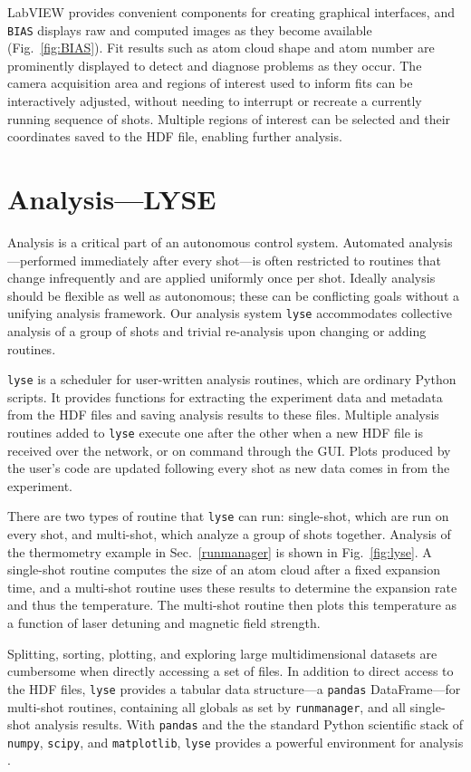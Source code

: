 LabVIEW provides convenient components for creating graphical interfaces, and \texttt{BIAS} displays raw and computed images as they become available (Fig.~\ref{fig:BIAS}).
Fit results such as atom cloud shape and atom number are prominently displayed to detect and diagnose problems as they occur.
The camera acquisition area and regions of interest used to inform fits can be interactively adjusted, without needing to interrupt or recreate a currently running sequence of shots.
Multiple regions of interest can be selected and their coordinates saved to the HDF file, enabling further analysis.



\section{Analysis---LYSE}\label{lyse}

Analysis is a critical part of an autonomous control system.
Automated analysis---performed immediately after every shot---is often restricted to routines that change infrequently and are applied uniformly once per shot.
Ideally analysis should be flexible as well as autonomous; these can be conflicting goals without a unifying analysis framework.
Our analysis system \texttt{lyse} accommodates collective analysis of a group of shots and trivial re-analysis upon changing or adding routines.

\texttt{lyse} is a scheduler for user-written analysis routines, which are ordinary Python scripts.
It provides functions for extracting the experiment data and metadata from the HDF files and saving analysis results to these files.
Multiple analysis routines added to \texttt{lyse} execute one after the other when a new HDF file is received over the network, or on command through the GUI.
Plots produced by the user's code are updated following every shot as new data comes in from the experiment.

There are two types of routine that \texttt{lyse} can run: single-shot, which are run on every shot, and multi-shot, which analyze a group of shots together.
Analysis of the thermometry example in Sec.~\ref{runmanager} is shown in Fig.~\ref{fig:lyse}.
A single-shot routine computes the size of an atom cloud after a fixed expansion time, and a multi-shot routine uses these results to determine the expansion rate and thus the temperature.
The multi-shot routine then plots this temperature as a function of laser detuning and magnetic field strength.

Splitting, sorting, plotting, and exploring large multidimensional datasets are cumbersome when directly accessing a set of files.
In addition to direct access to the HDF files, \texttt{lyse} provides a tabular data structure---a \texttt{pandas}\cite{mckinney_pandas} DataFrame---for multi-shot routines, containing all globals as set by \texttt{runmanager}, and all single-shot analysis results.
With \texttt{pandas} and the the standard Python scientific stack of \texttt{numpy}\cite{oliphant_numpy}, \texttt{scipy}\cite{jones_scipy_2001}, and \texttt{matplotlib}\cite{hunter_matplotlib:_2007}, \texttt{lyse} provides a powerful environment for analysis \cite{mckinney_python_2012}.

